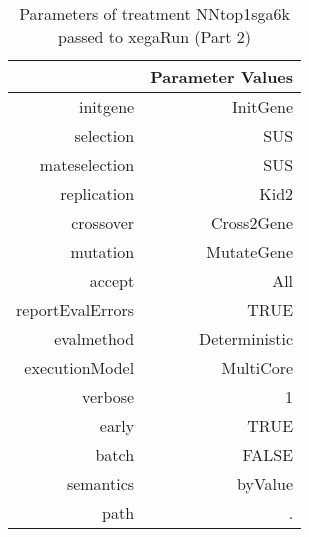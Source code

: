 \begin{table}[ht]
\centering
\begin{tabular}{rr}
  \hline
 & Parameter Values \\ 
  \hline
initgene & InitGene \\ 
  selection & SUS \\ 
  mateselection & SUS \\ 
  replication & Kid2 \\ 
  crossover & Cross2Gene \\ 
  mutation & MutateGene \\ 
  accept & All \\ 
  reportEvalErrors & TRUE \\ 
  evalmethod & Deterministic \\ 
  executionModel & MultiCore \\ 
  verbose & 1 \\ 
  early & TRUE \\ 
  batch & FALSE \\ 
  semantics & byValue \\ 
  path & . \\ 
   \hline
\end{tabular}
\caption{ Parameters of treatment NNtop1sga6k passed to xegaRun
 (Part 2)} 
\end{table}
